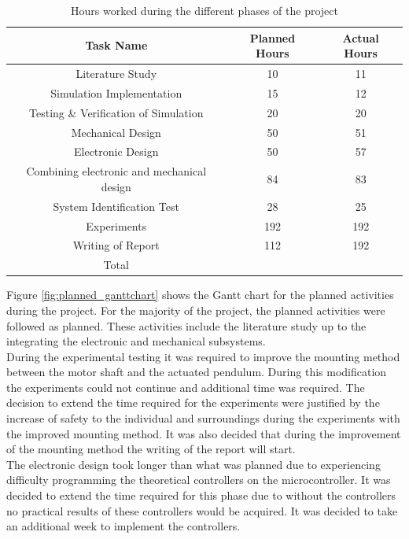 \begin{table}[h]
	\centering
	\begin{tabular}{|c|c|c|}
		\hline
		Task Name & Planned Hours & Actual Hours \\
		\hline
		\hline
		Literature Study & 10 & 11 \\
		\hline
		Simulation Implementation & 15 & 12 \\
		\hline
		Testing \& Verification of Simulation & 20 & 20 \\
		\hline 
		Mechanical Design  & 50 & 51 \\
		\hline
		Electronic Design & 50 & 57 \\
		\hline
		Combining electronic and mechanical design & 84 & 83 \\
		\hline
		System Identification Test & 28 & 25 \\
		\hline
		Experiments & 192 & 192\\
		\hline
		Writing of Report & 112 & 192 \\
		\hline
		\hline
		Total & & \\
		\hline
		
	\end{tabular}
	\caption{Hours worked during the different phases of the project}
	\label{table:hours_worked}
\end{table}

Figure \ref{fig:planned_ganttchart} shows the Gantt chart for the planned activities during the project. For the majority of the project, the planned activities were followed as planned. These activities include the literature study up to the integrating the electronic and mechanical subsystems.\\

During the experimental testing it was required to improve the mounting method between the motor shaft and the actuated pendulum. During this modification the experiments could not continue and additional time was required. The decision to extend the time required for the experiments were justified by the increase of safety to the individual and surroundings during the experiments with the improved mounting method. It was also decided that during the improvement of the mounting method the writing of the report will start.\\	

The electronic design took longer than what was planned due to experiencing difficulty programming the theoretical controllers on the microcontroller. It was decided to extend the time required for this phase due to without the controllers no practical results of these controllers would be acquired. It was decided to take an additional week to implement the controllers.\\

